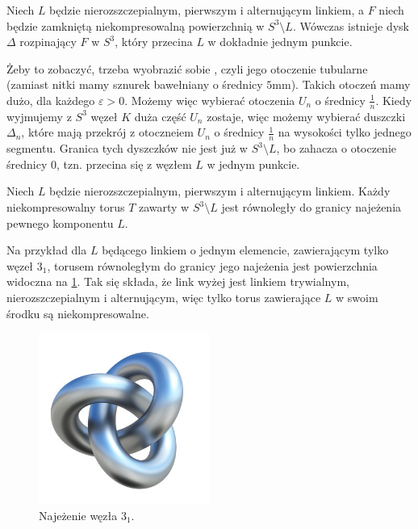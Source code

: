 \documentclass{article}
\begin{document}
\begin{fuck}
  Niech $L$ będzie nierozszczepialnym, pierwszym i alternującym linkiem, a $F$ niech będzie zamkniętą niekompresowalną powierzchnią w $S^3\setminus L$. Wówczas istnieje dysk $\Delta$ rozpinający $F$ w $S^3$, który przecina $L$ w dokładnie jednym punkcie.
\end{fuck}

Żeby to zobaczyć, trzeba wyobrazić sobie , czyli jego otoczenie tubularne (zamiast nitki mamy sznurek bawełniany o średnicy $5$mm). Takich otoczeń mamy dużo, dla każdego $\varepsilon>0$. Możemy więc wybierać otoczenia $U_n$ o średnicy $\frac{1}{n}$. Kiedy wyjmujemy z $S^3$ węzeł $K$ duża część $U_n$ zostaje, więc możemy wybierać duszczki $\Delta_n$, które mają przekrój z otoczneiem $U_n$ o średnicy $\frac{1}{n}$ na wysokości tylko jednego segmentu. Granica tych dyszczków nie jest już w $S^3\setminus L$, bo zahacza o otoczenie średnicy $0$, tzn. przecina się z węzłem $L$ w jednym punkcie.

\begin{fuck}
  Niech $L$ będzie nierozszczepialnym, pierwszym i alternującym linkiem. Każdy niekompresowalny torus $T$ zawarty w $S^3\setminus L$ jest równoległy do granicy najeżenia pewnego komponentu $L$.
\end{fuck}

Na przykład dla $L$ będącego linkiem o jednym elemencie, zawierającym tylko węzeł $3_1$, torusem równoległym do granicy jego najeżenia jest powierzchnia widoczna na \cref{najezenie trefoil}. Tak się składa, że link wyżej jest linkiem trywialnym, nierozszczepialnym i alternującym, więc tylko torus zawierające $L$ w swoim środku są niekompresowalne.

\begin{figure}[h]\centering
  \includegraphics[width=0.5\textwidth]{trefoil-3d.jpg}
  \caption{\label{najezenie trefoil}Najeżenie węzła $3_1$.}
\end{figure}
\end{document}
